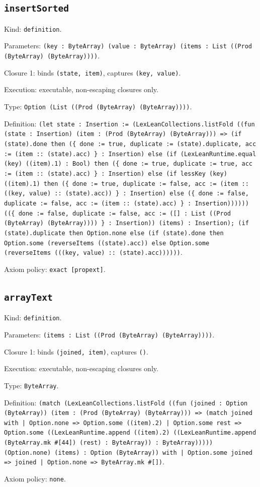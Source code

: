 \documentclass[11pt]{article}
\begin{document}
\subsection*{\texttt{insertSorted}}
\noindent Kind: \texttt{definition}.\par
\noindent Parameters: \texttt{(key : ByteArray) (value : ByteArray) (items : List ((Prod (ByteArray) (ByteArray))))}.\par
\noindent Closure 1: binds \texttt{(state, item)}, captures \texttt{(key, value)}.\par
\noindent Execution: executable, non-escaping closures only.\par
\noindent Type: \texttt{Option (List ((Prod (ByteArray) (ByteArray))))}.\par
\noindent Definition: \texttt{(let state : Insertion := (LexLeanCollections.listFold ((fun (state : Insertion) (item : (Prod (ByteArray) (ByteArray))) => (if (state).done then (\{ done := true, duplicate := (state).duplicate, acc := (item :: (state).acc) \} : Insertion) else (if (LexLeanRuntime.equal (key) ((item).1) : Bool) then (\{ done := true, duplicate := true, acc := (item :: (state).acc) \} : Insertion) else (if lessKey (key) ((item).1) then (\{ done := true, duplicate := false, acc := (item :: ((key, value) :: (state).acc)) \} : Insertion) else (\{ done := false, duplicate := false, acc := (item :: (state).acc) \} : Insertion)))))) ((\{ done := false, duplicate := false, acc := ([] : List ((Prod (ByteArray) (ByteArray)))) \} : Insertion)) (items) : Insertion); (if (state).duplicate then Option.none else (if (state).done then Option.some (reverseItems ((state).acc)) else Option.some (reverseItems (((key, value) :: (state).acc))))))}.\par
\noindent Axiom policy: \texttt{exact [propext]}.\par
\subsection*{\texttt{arrayText}}
\noindent Kind: \texttt{definition}.\par
\noindent Parameters: \texttt{(items : List ((Prod (ByteArray) (ByteArray))))}.\par
\noindent Closure 1: binds \texttt{(joined, item)}, captures \texttt{()}.\par
\noindent Execution: executable, non-escaping closures only.\par
\noindent Type: \texttt{ByteArray}.\par
\noindent Definition: \texttt{(match (LexLeanCollections.listFold ((fun (joined : Option (ByteArray)) (item : (Prod (ByteArray) (ByteArray))) => (match joined with | Option.none => Option.some ((item).2) | Option.some rest => Option.some ((LexLeanRuntime.append ((item).2) ((LexLeanRuntime.append (ByteArray.mk \#[44]) (rest) : ByteArray)) : ByteArray))))) (Option.none) (items) : Option (ByteArray)) with | Option.some joined => joined | Option.none => ByteArray.mk \#[])}.\par
\noindent Axiom policy: \texttt{none}.\par
\end{document}
